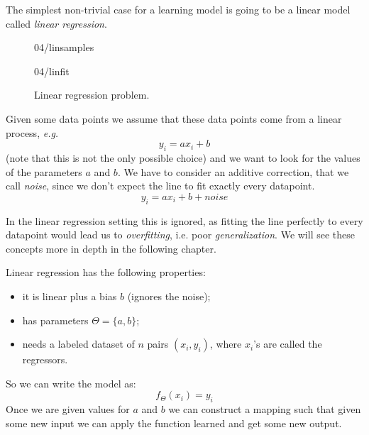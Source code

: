 
The simplest non-trivial case for a learning model is going to be a linear model called \emph{linear regression}.

\begin{figure}[H]
	\begin{center}
		\begin{overpic}
			[trim=0cm 0cm 0cm 0cm,clip,width=0.4\linewidth]{04/linsamples}
		\end{overpic}\hspace{0.5cm}
		\begin{overpic}
			[trim=0cm 0cm 0cm 0cm,clip,width=0.4\linewidth]{04/linfit}
		\end{overpic}
	\end{center}
	\caption{Linear regression problem.}\label{fig:lin-reg}	
\end{figure}

Given some data points we assume that these data points come from a linear process, \textit{e.g.} 
\[ 
	y_i = ax_i + b
\] 
(note that this is not the only possible choice) and we want to look for the values of the parameters $a$ and $b$. 
We have to consider an additive correction, that we call \emph{noise}, since we don't expect the line to fit exactly every datapoint.
\begin{equation}
	y_i = ax_i + b + noise
\end{equation}

In the linear regression setting this is ignored, as fitting the line perfectly to every datapoint would lead us to \emph{overfitting}, i.e. poor \emph{generalization}. We will see these concepts more in depth in the following chapter.

Linear regression has the following properties:
\begin{itemize}
	\item it is linear plus a bias $b$ (ignores the noise);
	\item has parameters $\Theta = \{a, b\}$;
	\item needs a labeled dataset of $n$ pairs $(x_i, y_i)$, where $x_i$'s are called the regressors.
\end{itemize}
So we can write the model as:
\begin{equation}
	f_{\Theta}(x_i) = y_i
\end{equation}
Once we are given values for $a$ and $b$ we can construct a mapping such that given some new input we can apply the function learned and get some new output.

